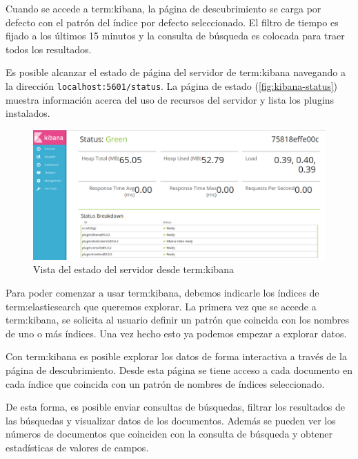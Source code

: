 Cuando se accede a \gls{term:kibana}, la página de descubrimiento se carga por
defecto con el patrón del índice por defecto seleccionado. El filtro de tiempo
es fijado a los últimos 15 minutos y la consulta de búsqueda es colocada para
traer todos los resultados.

Es posible alcanzar el estado de página del servidor de \gls{term:kibana}
navegando a la dirección \lstinline{localhost:5601/status}. La página de estado
(\autoref{fig:kibana-status}) muestra información acerca del uso de recursos
del servidor y lista los plugins instalados.

\begin{figure}
  \includegraphics[width=\linewidth]{src/images/05-capitulo-5/kibanastatus.jpg}
  \caption{Vista del estado del servidor desde \gls{term:kibana}}
  \label{fig:kibana-status}
\end{figure}


Para poder comenzar a usar \gls{term:kibana}, debemos indicarle los índices de
\gls{term:elasticsearch} que queremos explorar. La primera vez que se accede a
\gls{term:kibana}, se solicita al usuario definir un patrón que coincida con
los nombres de uno o más índices. Una vez hecho esto ya podemos empezar a
explorar datos.



Con \gls{term:kibana} es posible explorar los datos de forma interactiva a
través de la página de descubrimiento. Desde esta página se tiene acceso a cada
documento en cada índice que coincida con un patrón de nombres de índices
seleccionado.

De esta forma, es posible enviar consultas de búsquedas, filtrar los resultados
de las búsquedas y visualizar datos de los documentos. Además se pueden ver los
números de documentos que coinciden con la consulta de búsqueda y obtener
estadísticas de valores de campos.

